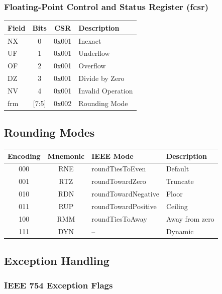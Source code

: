 \subsubsection{Floating-Point Control and Status Register (fcsr)}

\begin{table}[H]
\centering
\begin{tabular}{|l|c|c|l|}
\hline
\textbf{Field} & \textbf{Bits} & \textbf{CSR} & \textbf{Description} \\ \hline
NX & 0 & 0x001 & Inexact \\ \hline
UF & 1 & 0x001 & Underflow \\ \hline
OF & 2 & 0x001 & Overflow \\ \hline
DZ & 3 & 0x001 & Divide by Zero \\ \hline
NV & 4 & 0x001 & Invalid Operation \\ \hline
frm & [7:5] & 0x002 & Rounding Mode \\ \hline
\end{tabular}
\end{table}

\subsection{Rounding Modes}

\begin{table}[H]
\centering
\begin{tabular}{|c|c|l|l|}
\hline
\textbf{Encoding} & \textbf{Mnemonic} & \textbf{IEEE Mode} & \textbf{Description} \\ \hline
000 & RNE & roundTiesToEven & Default \\ \hline
001 & RTZ & roundTowardZero & Truncate \\ \hline
010 & RDN & roundTowardNegative & Floor \\ \hline
011 & RUP & roundTowardPositive & Ceiling \\ \hline
100 & RMM & roundTiesToAway & Away from zero \\ \hline
111 & DYN & -- & Dynamic \\ \hline
\end{tabular}
\end{table}

\subsection{Exception Handling}

\subsubsection{IEEE 754 Exception Flags}

